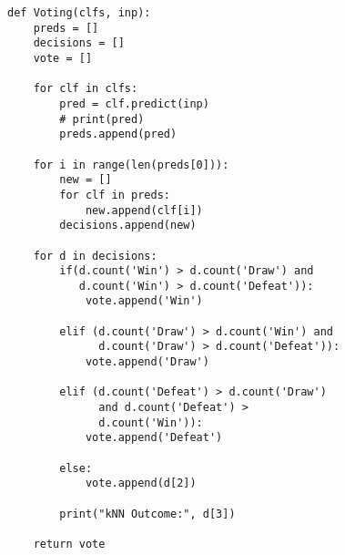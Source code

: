 \documentclass[10pt,journal,compsoc]{IEEEtran}
\begin{document}
\lstset{language=Python}
\lstset{frame=lines}
\begin{lstlisting}
def Voting(clfs, inp):
    preds = []
    decisions = []
    vote = []

    for clf in clfs:
        pred = clf.predict(inp)
        # print(pred)
        preds.append(pred)

    for i in range(len(preds[0])):
        new = []
        for clf in preds:
            new.append(clf[i])
        decisions.append(new)

    for d in decisions:
        if(d.count('Win') > d.count('Draw') and
           d.count('Win') > d.count('Defeat')):
            vote.append('Win')

        elif (d.count('Draw') > d.count('Win') and
              d.count('Draw') > d.count('Defeat')):
            vote.append('Draw')

        elif (d.count('Defeat') > d.count('Draw') 
              and d.count('Defeat') >
              d.count('Win')):
            vote.append('Defeat')

        else:
            vote.append(d[2])

        print("kNN Outcome:", d[3])

    return vote
\end{lstlisting}



%
\end{document}
